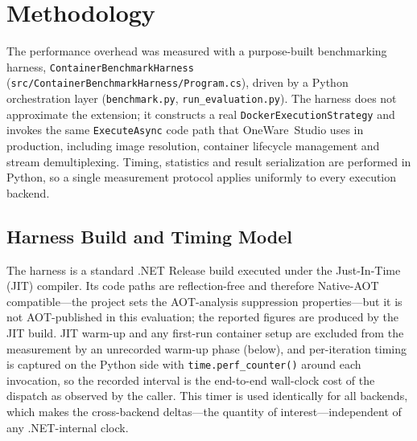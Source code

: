 \section{Methodology}
The performance overhead was measured with a purpose-built benchmarking harness, \texttt{Container\-Benchmark\-Harness} (\texttt{src/ContainerBenchmarkHarness/Program.cs}), driven by a Python orchestration layer (\texttt{benchmark.py}, \texttt{run\_evaluation.py}). The harness does not approximate the extension; it constructs a real \texttt{DockerExecutionStrategy} and invokes the same \texttt{ExecuteAsync} code path that OneWare~Studio uses in production, including image resolution, container lifecycle management and stream demultiplexing. Timing, statistics and result serialization are performed in Python, so a single measurement protocol applies uniformly to every execution backend.

\subsection{Harness Build and Timing Model}
The harness is a standard .NET Release build executed under the Just-In-Time (JIT) compiler. Its code paths are reflection-free and therefore Native-AOT compatible---the project sets the AOT-analysis suppression properties---but it is not AOT-published in this evaluation; the reported figures are produced by the JIT build. JIT warm-up and any first-run container setup are excluded from the measurement by an unrecorded warm-up phase (below), and per-iteration timing is captured on the Python side with \texttt{time.perf\_counter()} around each invocation, so the recorded interval is the end-to-end wall-clock cost of the dispatch as observed by the caller. This timer is used identically for all backends, which makes the cross-backend deltas---the quantity of interest---independent of any .NET-internal clock.

